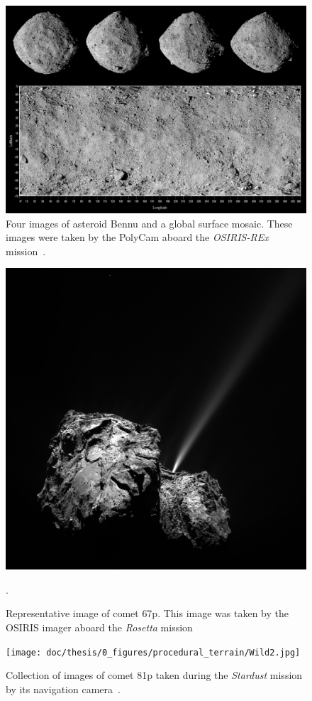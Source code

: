 \begin{figure}[htb]
    \centering
    \includegraphics[width=.7\textwidth]{doc/thesis/0_figures/procedural_terrain/2963_Bennu.png}
    \caption{Four images of asteroid Bennu and a global surface mosaic. These images were taken by the PolyCam aboard the \textit{OSIRIS-REx} mission~\cite{FourExploration}.}
    \label{fig:render_quali_bennu}
\end{figure}

\begin{figure}[htb]
    \centering
    \includegraphics[width=.8\textwidth]{doc/thesis/0_figures/procedural_terrain/67P_CG.PNG}
    \caption{Representative image of comet \acrlong{67p}. This image was taken by the OSIRIS imager aboard the \textit{Rosetta} mission~\cite{OSIRISArchiveb}}.
    \label{fig:render_quali_67p}
\end{figure}

\begin{figure}[htb]
    \centering
    \texttt{[image: doc/thesis/0\_figures/procedural\_terrain/Wild2.jpg]}
    \caption{Collection of images of comet \acrlong{81p} taken during the \textit{Stardust} mission by its navigation camera~\cite{StardustImages}.}
    \label{fig:render_quali_81p}
\end{figure}

